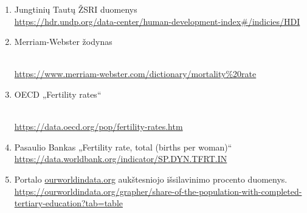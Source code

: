 \begin{enumerate}
    \item Jungtinių Tautų ŽSRI duomenys \\
    \href{https://hdr.undp.org/data-center/human-development-index\#/indicies/HDI}{https://hdr.undp.org/data-center/human-development-index\#/indicies/HDI}
    \item \hypertarget{merriam}{Merriam-Webster žodynas} \\
    \href{https://www.merriam-webster.com/dictionary/mortality\%20rate}{https://www.merriam-webster.com/dictionary/mortality\%20rate}
    \item \hypertarget{oecd}{OECD „Fertility rates“} \\
    \href{https://data.oecd.org/pop/fertility-rates.htm}{https://data.oecd.org/pop/fertility-rates.htm}
    \item Pasaulio Bankas „Fertility rate, total (births per woman)“ \\
    \href{https://data.worldbank.org/indicator/SP.DYN.TFRT.IN}{https://data.worldbank.org/indicator/SP.DYN.TFRT.IN}
    \item Portalo \url{ourworldindata.org} aukštesniojo išsilavinimo procento duomenys. \\
    \href{https://ourworldindata.org/grapher/share-of-the-population-with-completed-tertiary-education?tab=table}{https://ourworldindata.org/grapher/share-of-the-population-with-completed-tertiary-education?tab=table}
\end{enumerate}

